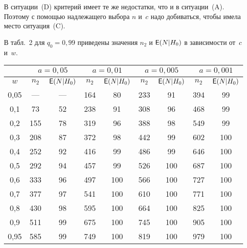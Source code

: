 \begin{multicols}{2}
В ситуации~(D) критерий имеет те же недостатки, что и в ситуации~(A). 
Поэтому с помощью надлежащего выбора $n$ и~$c$ надо добиваться,
чтобы имела место ситуация~(C).

В табл.~2 для $q_0=0{,}99$ приведены значения $n_2$ и ${\sf E}(N|H_0)$
в зависимости от~$c$ и~$w$.

\begin{table*}\small
\begin{center}
\parbox{120mm}{

}

\vspace*{2ex}

\begin{tabular}{||c||c|c||c|c||c|c||c|c||}
\hline
 &\multicolumn{2}{|c||}{$a=0,05$} & \multicolumn{2}{|c||}{$a=0{,}01$} & \multicolumn{2}{|c||}{$a=0{,}005$} & 
 \multicolumn{2}{|c||}{$a=0{,}001$} \\
\hline $w$ & $n_2$ & ${\sf E}(N|H_0)$ &$n_2$ & ${\sf E}(N|H_0)$
&$n_2$ &
${\sf E}(N|H_0)$ &$n_2$ & ${\sf E}(N|H_0)$ \\
\hline
\hphantom{9}0,05& --- & --- & 164 & \hphantom{9}80 & 233 & \hphantom{9}91 & 394 & \hphantom{9}99 \\
0,1 & \hphantom{9}73 & 52 & 238 & \hphantom{9}91 & 308 & \hphantom{9}96 & 468 & \hphantom{9}99 \\
0,2 & 155 & 78 & 319 & \hphantom{9}96 & 388 & \hphantom{9}98 & 549 & \hphantom{9}99 \\
0,3 & 208 & 87 & 372 & \hphantom{9}98 & 442 & \hphantom{9}99 & 602 & 100 \\
0,4 & 252 & 92 & 416 & \hphantom{9}99 & 486 & \hphantom{9}99 & 646 & 100 \\
0,5 & 292 & 94 & 457 & \hphantom{9}99 & 526 & 100 & 687 & 100 \\
0,6 & 333 & 96 & 497 & 100 & 566 & 100 & 727 & 100 \\
0,7 & 377 & 97 & 541 & 100 & 610 & 100 & 771 & 100 \\
0,8 & 430 & 98 & 595 & 100 & 664 & 100 & 825 & 100 \\
0,9 & 511 & 99 & 675 & 100 & 745 & 100 & 905 & 100 \\
\hphantom{9}0,95 & 585 & 99 & 749 & 100 & 819 & 100 & 979 & 100 \\
\hline
\end{tabular}
\end{center}
\end{table*}




\end{multicols}

